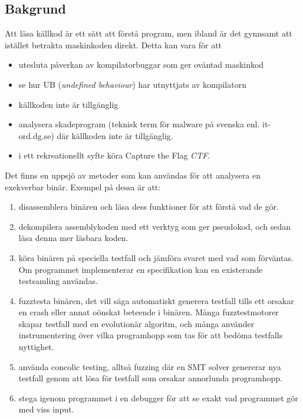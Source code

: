\subsection{Bakgrund}

Att läsa källkod är ett sätt att förstå program, men ibland är det gynnsamt att istället betrakta
maskinkoden direkt. Detta kan vara för att
\begin{itemize}
  \item utesluta påverkan av kompilatorbuggar som ger oväntad maskinkod
  \item se hur UB (\emph{undefined behaviour}) har utnyttjats av kompilatorn
  \item källkoden inte är tillgänglig
  \item analysera skadeprogram (teknisk term för malware på svenska enl.
    it-ord.dg.se) där källkoden inte är tillgänglig.
  \item i ett rekreationellt syfte köra Capture the Flag \textit{CTF}.
\end{itemize}

Det finns en uppsjö av metoder som kan användas för att analysera en exekverbar
binär. Exempel på dessa är att:
\begin{enumerate}
  \item disassemblera binären och läsa dess funktioner för att förstå vad de gör.
  \item dekompilera assemblykoden med ett verktyg som ger pseudokod, och sedan läsa denna mer
    läsbara koden.
  \item köra binären på speciella testfall och jämföra svaret med vad som förväntas. Om
    programmet implementerar en specifikation kan en existerande testsamling användas.
  \item fuzztesta binären, det vill säga automatiskt generera testfall tills ett orsakar en crash eller
    annat oönskat beteende i binären. Många fuzztestmotorer skapar testfall med en evolutionär
    algoritm, och många använder instrumentering över vilka programhopp som tas för att bedöma
    testfalls nyttighet.
  \item använda concolic testing, alltså fuzzing där en SMT solver genererar nya testfall genom att
    lösa för testfall som orsakar annorlunda programhopp.
  \item stega igenom programmet i en debugger för att se exakt vad programmet gör med viss input.
\end{enumerate}

